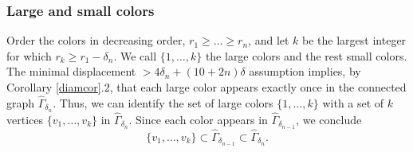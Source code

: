 \documentclass[11pt,letterpaper]{amsart}
\begin{document}
\subsubsection*{Large and small colors}
Order the colors in decreasing order, $r_1\geq\dots\geq r_n$, and let $k$ be the largest integer for which $r_k\geq r_1-\delta_n$. We call $\{1,\dots,k\}$ the large colors and the rest small colors. 
The minimal displacement $> 4\delta_n+(10+2n)\delta$ assumption implies, by Corollary \ref{diamcor}.2, that each large color appears exactly once in the connected graph $\hat\Gamma_{\delta_n}$.
Thus, we can identify the set of large colors $\{1,\dots,k\}$ with a set of $k$ vertices $\{v_1,\dots,v_k\}$ in $\hat\Gamma_{\delta_n}$. 
Since each color appears in $\hat\Gamma_{\delta_{n-1}}$, we conclude
$$
\{v_1,\dots,v_k\}\subset\hat\Gamma_{\delta_{n-1}}\subset\hat\Gamma_{\delta_n}.
$$
\end{document}
